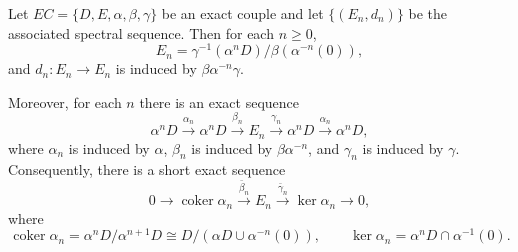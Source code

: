 Let $EC = \{D, E, \alpha, \beta, \gamma\}$ be an exact couple and let $\{(E_n, d_n)\}$ be the associated spectral sequence. Then for each $n \geq 0$,
$$E_n = \gamma^{-1}(\alpha^n D) / \beta(\alpha^{-n}(0)),$$
and $d_n: E_n \to E_n$ is induced by $\beta \alpha^{-n} \gamma$.

Moreover, for each $n$ there is an exact sequence
$$\alpha^n D \xrightarrow{\alpha_n} \alpha^n D \xrightarrow{\beta_n} E_n \xrightarrow{\gamma_n} \alpha^n D \xrightarrow{\alpha_n} \alpha^n D,$$
where $\alpha_n$ is induced by $\alpha$, $\beta_n$ is induced by $\beta\alpha^{-n}$, and $\gamma_n$ is induced by $\gamma$. Consequently, there is a short exact sequence
$$0 \to \operatorname{coker} \alpha_n \xrightarrow{\bar{\beta}_n} E_n \xrightarrow{\bar{\gamma}_n} \ker \alpha_n \to 0,$$
where
$$\operatorname{coker} \alpha_n = \alpha^n D / \alpha^{n+1} D \cong D / (\alpha D \cup \alpha^{-n}(0)), \qquad \ker \alpha_n = \alpha^n D \cap \alpha^{-1}(0).$$
